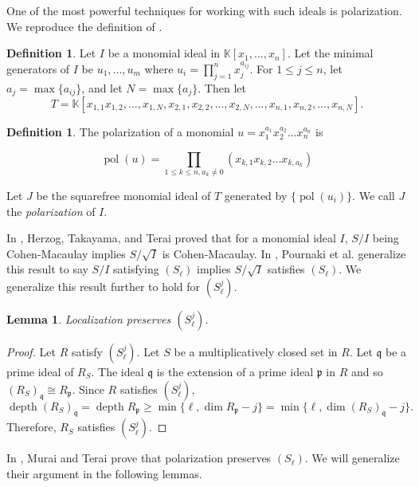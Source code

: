 \documentclass[11pt]{amsart}
\numberwithin{equation}{section}
\newtheorem{lemma}[theorem]{Lemma}
\theoremstyle{definition}
\newtheorem{defn}[theorem]{Definition}
\theoremstyle{remark}
\newcommand{\pol}{\operatorname{pol}}
\newcommand{\depth}{\operatorname{depth}}
\begin{document}
One of the most powerful techniques for working with such ideals is polarization.  We reproduce the definition of \cite{MT09}.

\begin{defn}
Let $I$ be a monomial ideal in $\mathbb{K}[x_1,...,x_n]$. Let the minimal generators of $I$ be $u_1,...,u_m$ where $u_i = \prod_{j=1}^n x_j^{a_{ij}}$. For $1 \leq j \leq n$, let $a_j = \max \{ a_{ij} \}$, and let $N=\max \{ a_j \}$. Then let \[ T = \mathbb{K}[x_{1,1}x_{1,2},...,x_{1,N},x_{2,1},x_{2,2},...,x_{2,N},...,x_{n,1},x_{n,2},...,x_{n,N}]. \]

\end{defn}

\begin{defn}
The polarization of a monomial $u = x_1^{a_1}x_2^{a_2}...x_n^{a_n}$ is 

\[ \pol(u) = \prod_{1 \leq k \leq n, a_k \neq 0} (x_{k,1}x_{k,2}...x_{k,a_k})\]

\end{defn}

Let $J$ be the squarefree monomial ideal of $T$ generated by $\{ \pol(u_i) \}$.  We call $J$ the \textit{polarization} of $I$. 

In \cite{HT05}, Herzog, Takayama, and Terai proved that for a monomial ideal $I$, $S/I$ being Cohen-Macaulay implies $S/\sqrt{I}$ is Cohen-Macaulay.  In \cite{PF14}, Pournaki et al. generalize this result to say $S/I$ satisfying $(S_\ell)$ implies $S/\sqrt{I}$ satisfies $(S_\ell)$.  We generalize this result further to hold for $(S_\ell^j)$.

\begin{lemma}
Localization preserves $(S_\ell^j)$.
\end{lemma}

\begin{proof}
Let $R$ satisfy $(S_\ell^j)$.  Let $S$ be a multiplicatively closed set in $R$.  Let $\mathfrak{q}$ be a prime ideal of $R_S$.  The ideal $\mathfrak{q}$ is the extension of a prime ideal $\mathfrak{p}$ in $R$ and so $(R_S)_\mathfrak{q} \cong R_\mathfrak{p}$.  Since $R$ satisfies $(S_\ell^j)$, \[\depth (R_S)_\mathfrak{q} = \depth R_\mathfrak{p} \geq \min\{ \ell, \dim R_\mathfrak{p} -j \} =\min \{ \ell, \dim (R_S)_\mathfrak{q} -j \}.\]  Therefore, $R_S$ satisfies $(S_\ell^j)$.
\end{proof}

In \cite{MT09}, Murai and Terai prove that polarization preserves $(S_\ell)$.  We will generalize their argument in the following lemmas.
\end{document}
